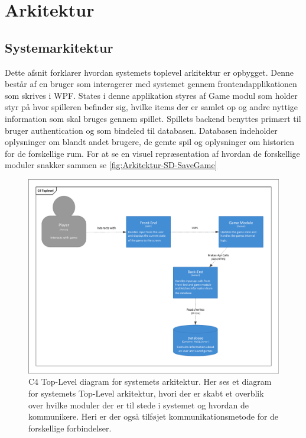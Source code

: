 \section{Arkitektur}

\subsection{Systemarkitektur}
\noindent
Dette afsnit forklarer hvordan systemets toplevel arkitektur er opbygget.
Denne består af en bruger som interagerer med systemet gennem frontendapplikationen som skrives i WPF. States i denne applikation styres af Game modul som holder styr på hvor spilleren befinder sig, hvilke items der er samlet op og andre nyttige information som skal bruges gennem spillet.
Spillets backend benyttes primært til bruger authentication og som bindeled til databasen.
Databasen indeholder oplysninger om blandt andet brugere, de gemte spil og oplysninger om historien for de forskellige rum.
For at se en visuel repræsentation af hvordan de forskellige moduler snakker sammen se \autoref{fig:Arkitektur-SD-SaveGame}

\begin{figure}[H]
\centering
\includegraphics[width = \textwidth]{02-Body/Images/Arkitektur-C4TopLevel.pdf}
\caption{C4 Top-Level diagram for systemets arkitektur. Her ses et diagram for systemets Top-Level arkitektur, hvori der er skabt et overblik over hvilke moduler der er til stede i systemet og hvordan de kommunikere. Heri er der også tilføjet kommunikationsmetode for de forskellige forbindelser.}
\label{fig:Arkitektur-SD-SaveGame}
\end{figure}









